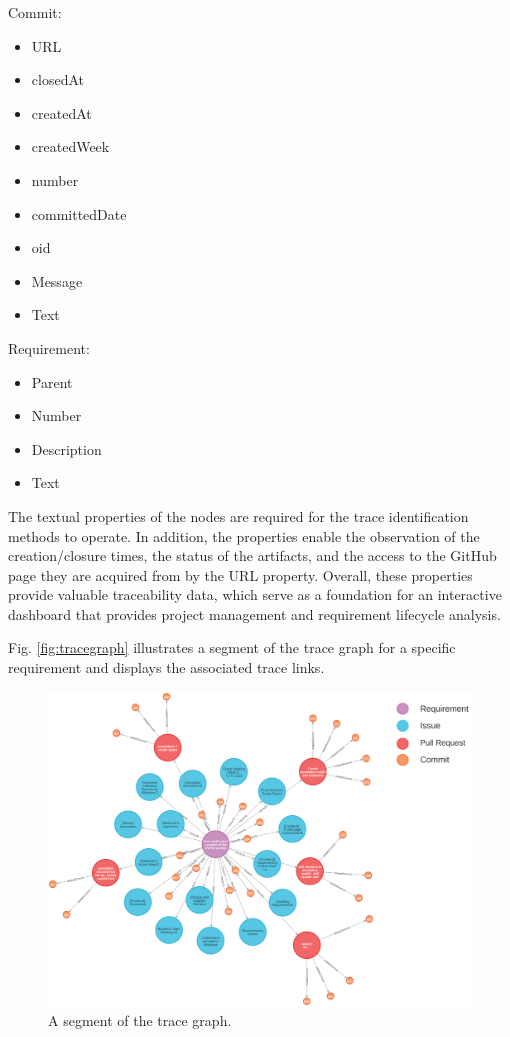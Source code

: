 \begin{multicols}{2}    

Commit:
\begin{itemize}
\item URL
\item closedAt
\item createdAt
\item createdWeek
\item number
\item committedDate
\item oid
\item Message
\item Text
\end{itemize}

\columnbreak

Requirement:
\begin{itemize}
\item Parent
\item Number
\item Description
\item Text
\end{itemize}



\end{multicols}

The textual properties of the nodes are required for the trace identification methods to operate. In addition, the properties enable the observation of the creation/closure times, the status of the artifacts, and the access to the GitHub page they are acquired from by the URL property. Overall, these properties provide valuable traceability data, which serve as a foundation for an interactive dashboard that provides project management and requirement lifecycle analysis.

Fig. \ref{fig:tracegraph} illustrates a segment of the trace graph for a specific requirement and displays the associated trace links.

\begin{figure}[htb]
    \centering
    \includegraphics[width=0.75\linewidth]{figs/rawTraceGraph.png}
    \caption{A segment of the trace graph.}
    \label{fig:rawtracegraph}
\end{figure}


